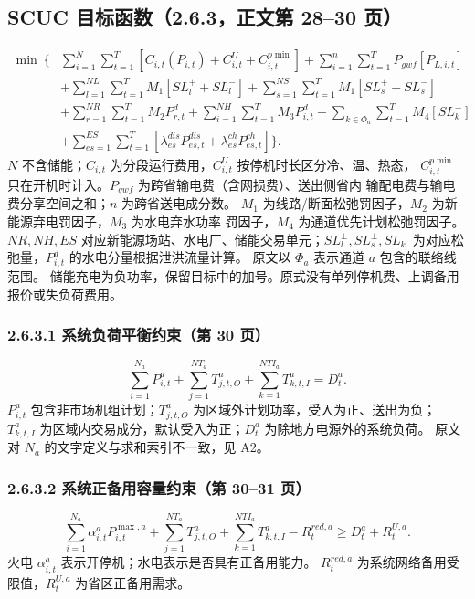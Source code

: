 \subsection{SCUC 目标函数（2.6.3，正文第 28--30 页）}
\begin{equation}\label{eq:southern-objective}
\begin{aligned}
\min\ \bigg\{&\sum_{i=1}^{N}\sum_{t=1}^{T}
 [C_{i,t}(P_{i,t})+C^U_{i,t}+C^{p\min}_{i,t}]
 +\sum_{i=1}^{n}\sum_{t=1}^{T}P_{gwf}[P_{L,i,t}]\\
 &+\sum_{l=1}^{NL}\sum_{t=1}^{T}M_1[SL_l^++SL_l^-]
 +\sum_{s=1}^{NS}\sum_{t=1}^{T}M_1[SL_s^++SL_s^-]\\
 &+\sum_{r=1}^{NR}\sum_{t=1}^{T}M_2P^d_{r,t}
 +\sum_{i=1}^{NH}\sum_{t=1}^{T}M_3P^d_{i,t}
 +\sum_{k\in\Phi_a}\sum_{t=1}^{T}M_4[SL_k^-]\\
 &+\sum_{es=1}^{ES}\sum_{t=1}^{T}
 [\lambda^{dis}_{es}P^{dis}_{es,t}+\lambda^{ch}_{es}P^{ch}_{es,t}]\bigg\}.
\end{aligned}
\end{equation}
$N$ 不含储能；$C_{i,t}$ 为分段运行费用，$C^U_{i,t}$ 按停机时长区分冷、温、热态，
$C^{p\min}_{i,t}$ 只在开机时计入。$P_{gwf}$ 为跨省输电费（含网损费）、送出侧省内
输配电费与输电费分享空间之和；$n$ 为跨省送电成分数。
$M_1$ 为线路/断面松弛罚因子，$M_2$ 为新能源弃电罚因子，$M_3$ 为水电弃水功率
罚因子，$M_4$ 为通道优先计划松弛罚因子。
$NR,NH,ES$ 对应新能源场站、水电厂、储能交易单元；$SL_l^\pm,SL_s^\pm,SL_k^-$
为对应松弛量，$P^d_{i,t}$ 的水电分量根据泄洪流量计算。
原文以 $\Phi_a$ 表示通道 $a$ 包含的联络线范围。
储能充电为负功率，保留目标中的加号。原式没有单列停机费、上调备用报价或失负荷费用。

\subsubsection{2.6.3.1 系统负荷平衡约束（第 30 页）}
\begin{equation}
 \sum_{i=1}^{N_a}P^a_{i,t}+\sum_{j=1}^{NT_a}T^a_{j,t,O}
 +\sum_{k=1}^{NTI_a}T^a_{k,t,I}=D^a_t.
\end{equation}
$P^a_{i,t}$ 包含非市场机组计划；$T^a_{j,t,O}$ 为区域外计划功率，受入为正、送出为负；
$T^a_{k,t,I}$ 为区域内交易成分，默认受入为正；$D^a_t$ 为除地方电源外的系统负荷。
原文对 $N_a$ 的文字定义与求和索引不一致，见 A2。

\subsubsection{2.6.3.2 系统正备用容量约束（第 30--31 页）}
\begin{equation}
 \sum_{i=1}^{N_a}\alpha^a_{i,t}P^{\max,a}_{i,t}
 +\sum_{j=1}^{NT_a}T^a_{j,t,O}+\sum_{k=1}^{NTI_a}T^a_{k,t,I}
 -R^{red,a}_t\ge D^a_t+R^{U,a}_t.
\end{equation}
火电 $\alpha^a_{i,t}$ 表示开停机；水电表示是否具有正备用能力。
$R^{red,a}_t$ 为系统网络备用受限值，$R^{U,a}_t$ 为省区正备用需求。

